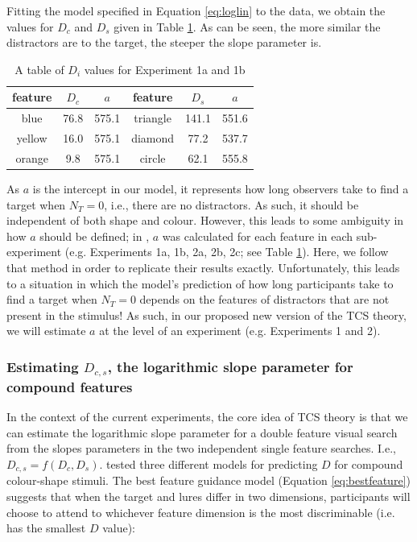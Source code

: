 \documentclass[preprint,12pt,authoryear]{elsarticle}
\begin{document}
Fitting the model specified in Equation \ref{eq:loglin} to the data, we obtain the values for $D_c$ and $D_s$ given in Table \ref{tab:reimp_Dc_Ds}. As can be seen, the more similar the distractors are to the target, the steeper the slope parameter is. 

\begin{table}[h]
\centering
\begin{tabular}{ ccc|ccc } 
feature & $D_c$ & $a$ & feature & $D_s$ & $a$\\
 \hline 
blue & 76.8 & 575.1 & triangle & 141.1 & 551.6\\
yellow & 16.0 & 575.1 & diamond & 77.2 & 537.7\\
orange & 9.8 & 575.1 & circle & 62.1& 555.8\\
\end{tabular}
\caption{A table of $D_i$ values for Experiment 1a and 1b}
\label{tab:reimp_Dc_Ds}
\end{table}

As $a$ is the intercept in our model, it represents how long observers take to find a target when $N_T = 0$, i.e., there are no distractors. As such, it should be independent of both shape and colour. However, this leads to some ambiguity in how $a$ should be defined; in \cite{buetti2019predicting}, $a$ was calculated for each feature in each sub-experiment (e.g. Experiments 1a, 1b, 2a, 2b, 2c; see Table \ref{tab:reimp_Dc_Ds}). Here, we follow that method in order to replicate their results exactly. Unfortunately, this leads to a situation in which the model's prediction of how long participants take to find a target when $N_T=0$ depends on the features of distractors that are not present in the stimulus! As such, in our proposed new version of the TCS theory, we will estimate $a$ at the level of an experiment (e.g. Experiments 1 and 2).

\subsubsection{Estimating $D_{c,s}$, the logarithmic slope parameter for compound features}

In the context of the current experiments, the core idea of TCS theory is that we can estimate the logarithmic slope parameter for a double feature visual search from the slopes parameters in the two independent single feature searches. I.e., $D_{c,s} = f(D_c, D_s)$. \cite{buetti2019predicting} tested three different models for predicting $D$ for compound colour-shape stimuli. The best feature guidance model (Equation \ref{eq:bestfeature}) suggests that when the target and lures differ in two dimensions, participants will choose to attend to whichever feature dimension is the most discriminable (i.e. has the smallest $D$ value):
\end{document}
